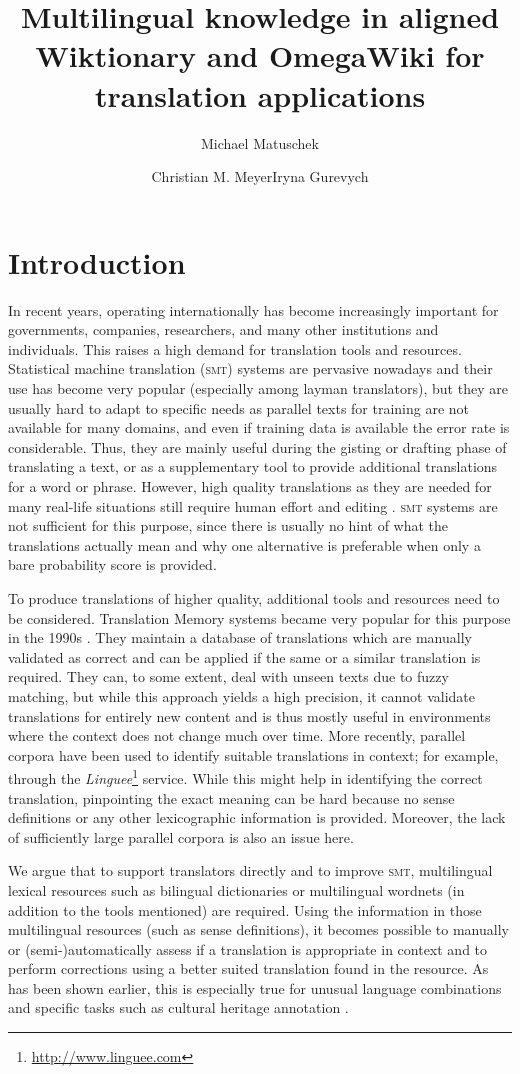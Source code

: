 \documentclass[output=paper]{LSP/langsci}
\title{Multilingual knowledge in aligned Wiktionary and OmegaWiki for translation applications}
\author{Michael Matuschek\affiliation{Ubiquitous Knowledge Processing Lab (\textsc{ukp-tuda})}\and  Christian M. Meyer\affiliation{Ubiquitous Knowledge Processing Lab (\textsc{ukp-tuda})}\lastand  Iryna Gurevych\affiliation{Ubiquitous Knowledge Processing Lab (\textsc{ukp-tuda}, \textsc{ukp-dipf})}}
\begin{document}
\section{Introduction}
\largerpage
\label{sec:matuschek:intro}
In recent years, operating internationally has become increasingly important for governments, companies, researchers, and many other institutions and individuals. This raises a high demand for translation tools and resources. Statistical machine translation (\textsc{smt}) systems are pervasive nowadays and their use has become very popular (especially among layman translators), but they are usually hard to adapt to specific needs as parallel texts for training are not available for many domains, and even if training data is available the error rate is considerable. Thus, they are mainly useful during the gisting or drafting phase of translating a text, or as a supplementary tool to provide additional translations for a word or phrase. However, high quality translations as they are needed for many real-life situations still require human effort and editing \citep{Koehn09,Carl10}. \textsc{smt} systems are not sufficient for this purpose, since there is usually no hint of what the translations actually mean and why one alternative is preferable when only a bare probability score is 
provided. 

To produce translations of higher quality, additional tools and resources need to be considered. Translation Memory systems became very popular for this purpose in the 1990s \citep{Somers03}. They maintain a database of translations which are manually validated as correct and can be applied if the same or a similar translation is required. They can, to some extent, deal with unseen texts due to fuzzy matching, but while this approach yields a high precision, it cannot validate translations for entirely new content and is thus mostly useful in environments where the context does not change much over time. More recently, parallel corpora have been used to identify suitable translations in context; for example, through the \textit{Linguee}\footnote{\url{http://www.linguee.com}} service. While this might help in identifying the correct translation, pinpointing the exact meaning can be hard because no sense definitions or any other lexicographic information is provided. Moreover, the lack of 
sufficiently 
large parallel corpora is also an issue here.

We argue that to support translators directly and to improve \textsc{smt}, multilingual lexical resources such as bilingual dictionaries or multilingual wordnets (in addition to the tools mentioned) are required. Using the information in those multilingual resources (such as sense definitions), it becomes possible to manually or (semi-)automatically assess if a translation is appropriate in context and to perform corrections using a better suited translation found in the resource. As has been shown earlier, this is especially true for unusual language combinations and specific tasks such as cultural heritage annotation \citep{DBLP:conf/lrec/DeclerckML12, DBLP:conf/semweb/MoerthDLV11}.
\end{document}
